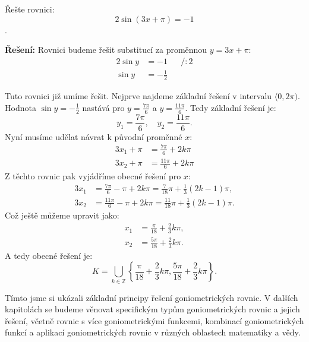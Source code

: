 \documentclass[12pt,a4paper]{article}
\begin{document}
\begin{examplebox}
    Řešte rovnici:
    \[
    2 \sin (3x + \pi) = -1
    \].

    \medskip
    \textbf{Řešení:}
    Rovnici budeme řešit substitucí za proměnnou $y = 3x + \pi$:
    \[
    \begin{aligned}
        2 \sin y &= -1 && \big/ : 2 \\[0.5em]
        \sin y &= -\frac{1}{2}
    \end{aligned}
    \]

    Tuto rovnici již umíme řešit. Nejprve najdeme základní řešení v intervalu $\langle 0, 2\pi)$.
    Hodnota $\sin y = -\frac{1}{2}$ nastává pro $y = \frac{7\pi}{6}$ a $y = \frac{11\pi}{6}$.
    Tedy základní řešení je:
    \[
    y_1 = \frac{7\pi}{6}, \quad y_2 = \frac{11\pi}{6}.
    \]
    Nyní musíme udělat návrat k původní proměnné $x$:
    \[
    \begin{aligned}
        3x_1 + \pi &= \frac{7\pi}{6} + 2k\pi \\[0.5em]
        3x_2 + \pi &= \frac{11\pi}{6} + 2k\pi
    \end{aligned}
    \]
    Z těchto rovnic pak vyjádříme obecné řešení pro $x$:
    \[
    \begin{aligned}
        3x_1 &= \frac{7\pi}{6} - \pi + 2k\pi = \frac{7}{18}\pi + \frac{1}{3}\left(2k - 1\right)\pi, \\[0.5em]
        3x_2 &= \frac{11\pi}{6} - \pi + 2k\pi = \frac{11}{18}\pi + \frac{1}{3}\left(2k - 1\right)\pi.
    \end{aligned}
    \]
    Což ještě můžeme upravit jako:
    \[
    \begin{aligned}
        x_1 &= \frac{\pi}{18} + \frac{2}{3}k\pi, \\[0.5em]
        x_2 &= \frac{5\pi}{18} + \frac{2}{3}k\pi.
    \end{aligned}
    \]
    A tedy obecné řešení je:
    \[
    K = \bigcup_{k \in \mathbb{Z}} \left\{ \frac{\pi}{18} + \frac{2}{3}k\pi, \frac{5\pi}{18} + \frac{2}{3}k\pi \right\}.
    \]
\end{examplebox}

Tímto jsme si ukázali základní principy řešení goniometrických rovnic.
V dalších kapitolách se budeme věnovat specifickým typům goniometrických rovnic
a jejich řešení, včetně rovnic s více goniometrickými funkcemi,
kombinací goniometrických funkcí a aplikací goniometrických rovnic v různých oblastech matematiky a vědy.
\end{document}
